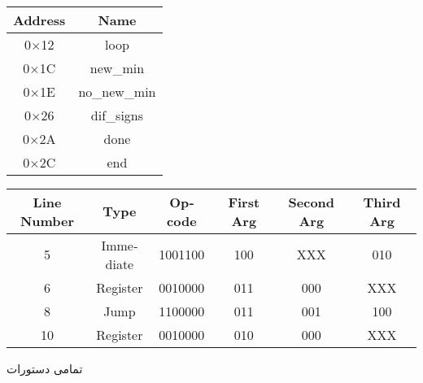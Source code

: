 \\
\noindent
{}
\begin{latin}
\begin{center}
\begin{tabular}{|c|c|}
    \hline
    Address & Name\\
    \hline
    0$\times$12 & loop\\
    \hline
    0$\times$1C & new\_min\\
    \hline
    0$\times$1E & no\_new\_min\\
    \hline
    0$\times$26 & dif\_signs\\
    \hline
    0$\times$2A & done\\
    \hline
    0$\times$2C & end\\
    \hline
\end{tabular}
\end{center}
\end{latin}
\noindent
{}
\begin{latin}
\begin{center}
\begin{tabular}{|c|c|c|c|c|c|}
    \hline
    Line Number & Type & Opcode & First Arg & Second Arg & Third Arg\\
    \hline
    5 & Immediate & 1001100 & 100 & XXX & 010\\
    \hline
    6 & Register & 0010000 & 011 & 000 & XXX\\
    \hline
    8 & Jump & 1100000 & 011 & 001 & 100\\
    \hline
    10 & Register & 0010000 & 010 & 000 & XXX\\
    \hline
\end{tabular}
\end{center}
\end{latin}
\noindent
{}
تمامی دستورات
